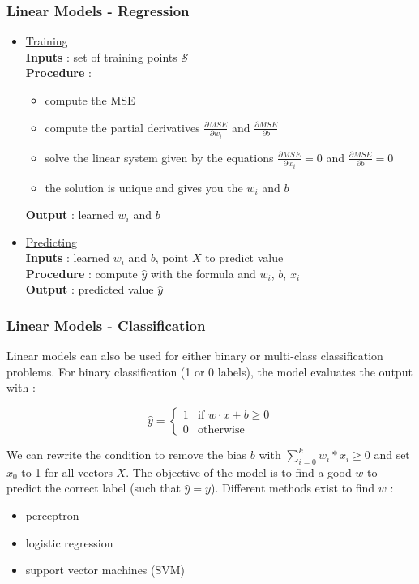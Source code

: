 \documentclass{beamer}
\begin{document}
\begin{frame}
  \frametitle{Linear Models - Regression}
  \begin{itemize}
    \item \underline{Training}\\
      \textbf{Inputs} : set of training points $\mathcal{S}$\\
      \textbf{Procedure} :
      \begin{itemize}
        \item compute the MSE
        \item compute the partial derivatives $\frac{\partial MSE}{\partial
          w_i}$ and  $\frac{\partial MSE}{\partial b}$
        \item solve the linear system given by the equations $\frac{\partial
          MSE}{\partial w_i}=0$ and $\frac{\partial MSE}{\partial b}=0$
        \item the solution is unique and gives you the $w_i$ and $b$

      \end{itemize}
      \textbf{Output} : learned $w_i$ and $b$

    \item \underline{Predicting}\\
      \textbf{Inputs} : learned $w_i$ and $b$, point $X$ to predict value\\
      \textbf{Procedure} : compute $\hat{y}$ with the formula and $w_i$, $b$,
      $x_i$\\
      \textbf{Output} : predicted value $\hat{y}$

  \end{itemize}
\end{frame}

\begin{frame}
  \frametitle{Linear Models - Classification}
  Linear models can also be used for either binary or multi-class classification
  problems. For binary classification (1 or 0 labels), the model evaluates the
  output with :

  \begin{equation*}
    \hat{y} =
      \begin{cases}
        1 & \text{if } w \cdot x + b \geq 0\\
        0 & \text{otherwise}
      \end{cases}
  \end{equation*}

  We can rewrite the condition to remove the bias $b$ with $\sum_{i = 0}^k w_i *
  x_i \geq 0$ and set $x_0$ to 1 for all vectors $X$. The objective of the model
  is to find a good $w$ to predict the correct label (such that $\hat{y} =
  y$). Different methods exist to find $w$ :
  \begin{itemize}
    \item perceptron
    \item logistic regression
    \item support vector machines (SVM)
  \end{itemize}
\end{frame}
\end{document}
